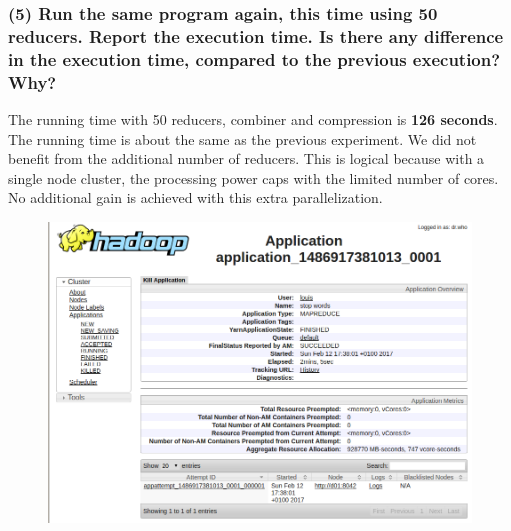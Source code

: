 \documentclass[a4paper,10pt]{article}
\begin{document}
\subsubsection{(5) Run the same program again, this time using 50 reducers. Report the
execution time. Is there any difference in the execution time, compared to
the previous execution? Why?}
The running time with 50 reducers, combiner and compression is \textbf{126 seconds}.
The running time is about the same as the previous experiment.
We did not benefit from the additional number of reducers.
This is logical because with a single node cluster, the processing power caps with
the limited number of cores. No additional gain is achieved with this extra parallelization.
\begin{figure}[H]
  \centering
  \includegraphics[width=.6\textwidth]{stopwords_50_reducers_1_combiner_compression.png}
\end{figure}
\end{document}
